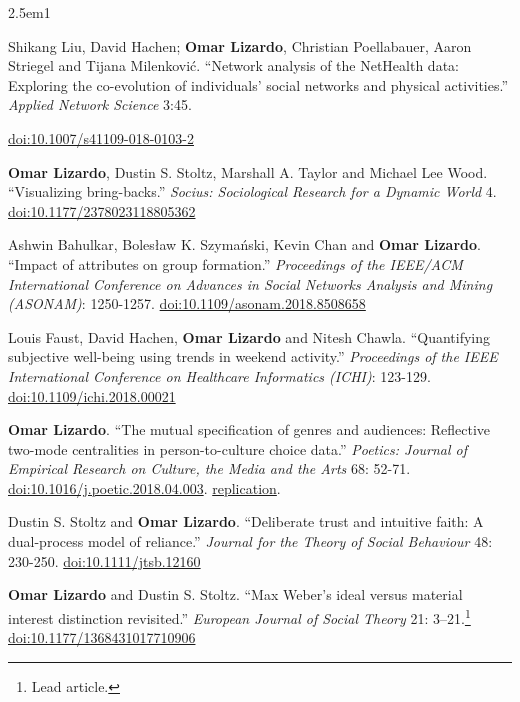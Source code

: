 \documentclass[
]{article}
\newenvironment{cventry}{\begin{hangparas}{2.5em}{1}}{\end{hangparas}}
\begin{document}
\begin{cventry}

Shikang Liu, David Hachen; \textbf{Omar Lizardo}, Christian Poellabauer,
Aaron Striegel and Tijana Milenković. ``Network analysis of the
NetHealth data: Exploring the co-evolution of individuals' social
networks and physical activities.'' \emph{Applied Network Science} 3:45.

\href{https://doi.org/10.1007/s41109-018-0103-2}{doi:10.1007/s41109-018-0103-2}

\textbf{Omar Lizardo}, Dustin S. Stoltz, Marshall A. Taylor and Michael
Lee Wood. ``Visualizing bring-backs.'' \emph{Socius: Sociological
Research for a Dynamic World} 4.
\href{https://doi.org/10.1177/2378023118805362}{doi:10.1177/2378023118805362}

Ashwin Bahulkar, Bolesław K. Szymański, Kevin Chan and \textbf{Omar
Lizardo}. ``Impact of attributes on group formation.'' \emph{Proceedings
of the IEEE/ACM International Conference on Advances in Social Networks
Analysis and Mining (ASONAM)}: 1250-1257.
\href{https://doi.org/10.1109/asonam.2018.8508658}{doi:10.1109/asonam.2018.8508658}

Louis Faust, David Hachen, \textbf{Omar Lizardo} and Nitesh Chawla.
``Quantifying subjective well-being using trends in weekend activity.''
\emph{Proceedings of the IEEE International Conference on Healthcare
Informatics (ICHI)}: 123-129.
\href{https://doi.org/10.1109/ichi.2018.00021}{doi:10.1109/ichi.2018.00021}

\textbf{Omar Lizardo}. ``The mutual specification of genres and
audiences: Reflective two-mode centralities in person-to-culture choice
data.'' \emph{Poetics: Journal of Empirical Research on Culture, the
Media and the Arts} 68: 52-71.
\href{https://doi.org/10.1016/j.poetic.2018.04.003}{doi:10.1016/j.poetic.2018.04.003}.
\href{https://github.com/olizardo/Reflective-Centralities}{
replication}.

Dustin S. Stoltz and \textbf{Omar Lizardo}. ``Deliberate trust and
intuitive faith: A dual-process model of reliance.'' \emph{Journal for
the Theory of Social Behaviour} 48: 230-250.
\href{https://doi.org/10.1111/jtsb.12160}{doi:10.1111/jtsb.12160}

\textbf{Omar Lizardo} and Dustin S. Stoltz. ``Max Weber's ideal versus
material interest distinction revisited.'' \emph{European Journal of
Social Theory} 21: 3--21.\footnote{Lead article.}
\href{https://doi.org/10.1177/1368431017710906}{doi:10.1177/1368431017710906}

\end{cventry}
\end{document}
